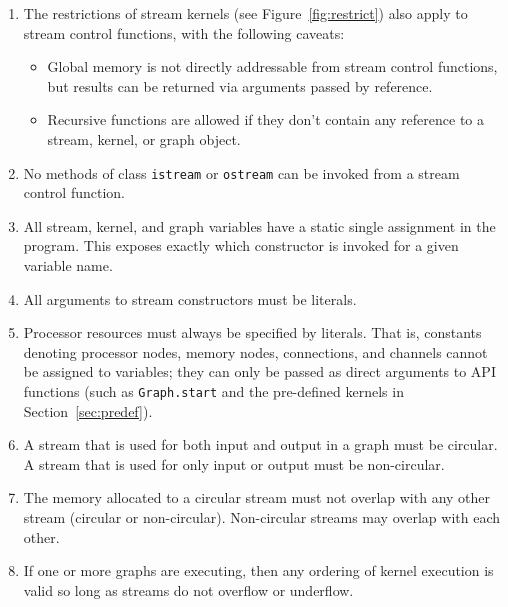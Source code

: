 \begin{enumerate}

\item The restrictions of stream kernels (see
Figure~\ref{fig:restrict}) also apply to stream control functions,
with the following caveats:

\begin{itemize}

\item Global memory is not directly addressable from stream control
functions, but results can be returned via arguments passed by
reference.

\item Recursive functions are allowed if they don't contain any
reference to a stream, kernel, or graph object.

\end{itemize}

\item No methods of class {\tt istream} or {\tt ostream} can be
invoked from a stream control function.

\item All stream, kernel, and graph variables have a static single
assignment in the program.  This exposes exactly which constructor is
invoked for a given variable name.

\item All arguments to stream constructors must be literals.

\item Processor resources must always be specified by literals.  That
is, constants denoting processor nodes, memory nodes, connections, and
channels cannot be assigned to variables; they can only be passed as
direct arguments to API functions (such as {\tt Graph.start} and the
pre-defined kernels in Section~\ref{sec:predef}).

\item A stream that is used for both input and output in a graph must
be circular.  A stream that is used for only input or output must be
non-circular.

\item The memory allocated to a circular stream must not overlap with
any other stream (circular or non-circular).  Non-circular streams may
overlap with each other.

\item If one or more graphs are executing, then any ordering of kernel
execution is valid so long as streams do not overflow or underflow.


\end{enumerate}
